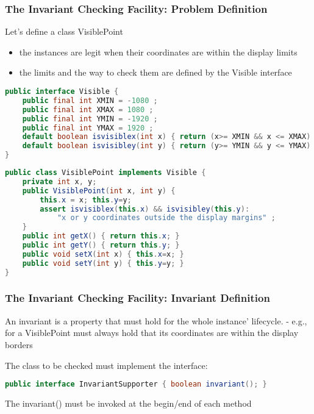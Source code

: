 \subsubsection{The Invariant Checking Facility: Problem Definition}

Let’s define a class VisiblePoint
\begin{itemize}
	\item the instances are legit when their coordinates are within the display limits
	\item the limits and the way to check them are defined by the Visible interface
\end{itemize}

\begin{lstlisting}[language=Java]
public interface Visible {
	public final int XMIN = -1080 ;
	public final int XMAX = 1080 ;
	public final int YMIN = -1920 ;
	public final int YMAX = 1920 ;
	default boolean isvisiblex(int x) { return (x>= XMIN && x <= XMAX) ; }
	default boolean isvisibley(int y) { return (y>= YMIN && y <= YMAX) ; }
}
\end{lstlisting}

\begin{lstlisting}[language=Java]
public class VisiblePoint implements Visible {
	private int x, y;
	public VisiblePoint(int x, int y) {
		this.x = x; this.y=y;
		assert isvisiblex(this.x) && isvisibley(this.y):
			"x or y coordinates outside the display margins" ;
	}
	public int getX() { return this.x; }
	public int getY() { return this.y; }
	public void setX(int x) { this.x=x; }
	public void setY(int y) { this.y=y; }
}
\end{lstlisting}

\subsubsection{The Invariant Checking Facility: Invariant Definition}
An invariant is a property that must hold for the whole instance' lifecycle.
- e.g., for a VisiblePoint must always hold that its coordinates are within the display borders

The class to be checked must implement the interface:

\begin{lstlisting}[language=Java]
public interface InvariantSupporter { boolean invariant(); }
\end{lstlisting}

The invariant() must be invoked at the begin/end of each method

